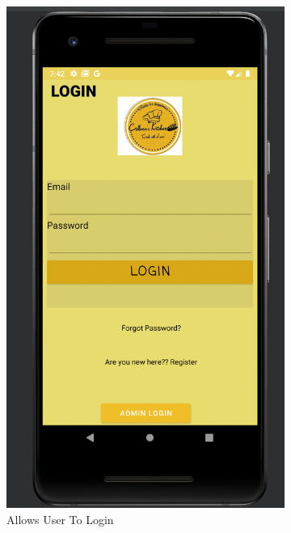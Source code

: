 \begin{figure}[H]
     \centering
     \begin{subfigure}[b]{0.3\textwidth}
         \centering
         \includegraphics[width=\textwidth]{m1}
         \caption{Allows User To Login}
         \label{first disp}
     \end{subfigure}
     \hfill
     \begin{subfigure}[b]{0.3\textwidth}
         \centering

\end{subfigure}
\end{figure}
